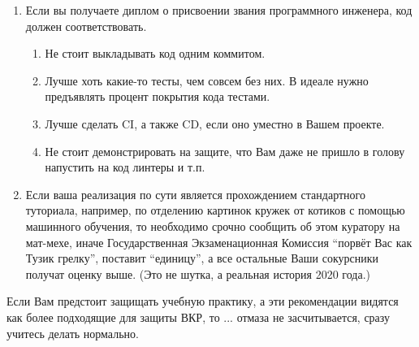 \begin{enumerate}
\begin{itemize}
        \end{itemize}
  \item Если вы получаете диплом о присвоении звания программного инженера, код должен соответствовать.
        \begin{enumerate}
          \item Не стоит выкладывать код одним коммитом.
          \item Лучше хоть какие-то тесты, чем совсем без них. В идеале нужно предъявлять процент покрытия кода тестами.
          \item Лучше  сделать \textsc{CI}, а также \textsc{CD}, если оно уместно в Вашем проекте.
          \item Не стоит демонстрировать на защите, что Вам даже не пришло в голову напустить на код линтеры и т.п.
        \end{enumerate}
  \item Если ваша реализация по сути является прохождением стандартного туториала, например, по отделению картинок кружек от котиков с помощью машинного обучения, то необходимо срочно сообщить об этом куратору на мат-мехе, иначе Государственная Экзаменацион\-ная Комиссия \enquote{порвёт Вас как Тузик грелку}, поставит \enquote{единицу}, а все остальные Ваши сокурсники получат оценку выше. (Это не шутка, а реальная история 2020 года.)
\end{enumerate}

\noindent Если Вам предстоит защищать учебную практику, а эти рекомендации видятся как более подходящие для защиты ВКР, то ... отмаза не засчиты\-вается, сразу учитесь делать нормально.
